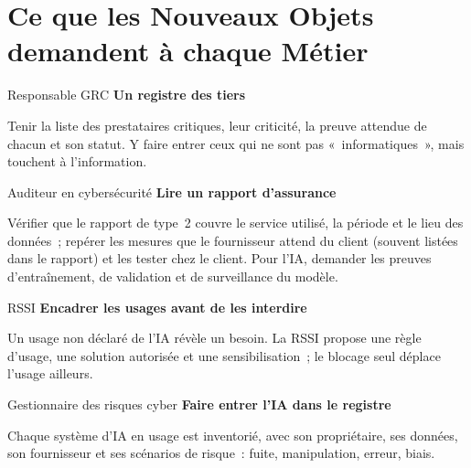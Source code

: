 \section{Ce que les Nouveaux Objets demandent à chaque Métier}
\label{sec:c15-metiers}

\begin{boxmetier}{Responsable GRC}
\textbf{Un registre des tiers}

Tenir la liste des prestataires critiques, leur criticité, la preuve
attendue de chacun et son statut. Y faire entrer ceux qui ne sont pas
«~informatiques~», mais touchent à l'information.
\end{boxmetier}

\begin{boxmetier}{Auditeur en cybersécurité}
\textbf{Lire un rapport d'assurance}

Vérifier que le rapport de type~2 couvre le service utilisé, la période et
le lieu des données~; repérer les mesures que le fournisseur attend du
client (souvent listées dans le rapport) et les tester chez le client.
Pour l'IA, demander les preuves d'entraînement, de validation et de
surveillance du modèle.
\end{boxmetier}

\begin{boxmetier}{RSSI}
\textbf{Encadrer les usages avant de les interdire}

Un usage non déclaré de l'IA révèle un besoin. La RSSI propose une règle
d'usage, une solution autorisée et une sensibilisation~; le blocage seul
déplace l'usage ailleurs.
\end{boxmetier}

\begin{boxmetier}{Gestionnaire des risques cyber}
\textbf{Faire entrer l'IA dans le registre}

Chaque système d'IA en usage est inventorié, avec son propriétaire, ses
données, son fournisseur et ses scénarios de risque~: fuite, manipulation,
erreur, biais.
\end{boxmetier}

\separateur

